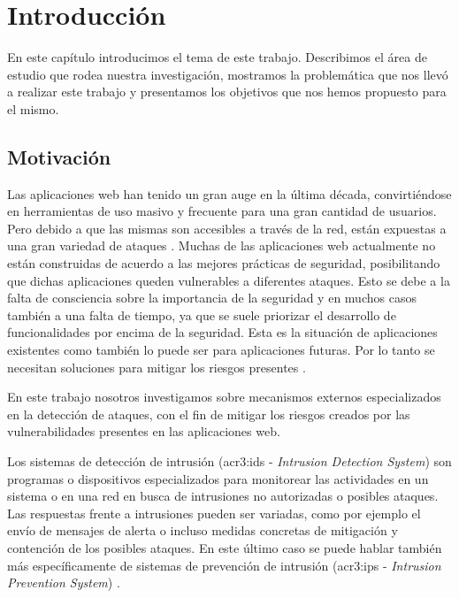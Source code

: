 \renewcommand{\newCommandChapterTitle}{Introducción}
\chapter{\newCommandChapterTitle}
\markright{\hfill \thechapter. \newCommandChapterTitle}
\label{chap:p3_introduction}


En este capítulo introducimos el tema de este trabajo. Describimos el área
de estudio que rodea nuestra investigación, mostramos la problemática que
nos llevó a realizar este trabajo y presentamos los objetivos que nos
hemos propuesto para el mismo.


\section{Motivación}

Las aplicaciones web han tenido un gran auge en la última década,
convirtiéndose en herramientas de uso masivo y frecuente para una gran
cantidad de usuarios. Pero debido a que las mismas son accesibles a
través de la red, están expuestas a una gran variedad de ataques
\citep{gimenez2015tfg}. %
Muchas de las aplicaciones web actualmente no están construidas de acuerdo
a las mejores prácticas de seguridad, posibilitando que  dichas aplicaciones
queden vulnerables a diferentes ataques.
Esto se debe a la falta de consciencia sobre la importancia de la seguridad
y en muchos casos también a una falta de tiempo, ya que se suele priorizar
el desarrollo de funcionalidades por encima de la seguridad. Esta es la
situación de aplicaciones existentes como también lo puede ser para
aplicaciones futuras. Por lo tanto se necesitan soluciones para mitigar
los riesgos presentes
\citep{robertson2009detecting}. %

En este trabajo nosotros investigamos sobre mecanismos externos
especializados en la detección de ataques, con el fin de mitigar los
riesgos creados por las vulnerabilidades presentes en las aplicaciones
web.
\bigskip

Los sistemas de detección de intrusión (\gls{acr3:ids} - \textit{Intrusion
Detection System}) son programas o dispositivos especializados para
monitorear las actividades en un sistema o en una red en busca de intrusiones
no autorizadas o posibles ataques. Las respuestas frente a intrusiones
pueden ser variadas, como por ejemplo el envío de mensajes de alerta o
incluso medidas concretas de mitigación y contención de los posibles
ataques. En este último caso se puede hablar también más específicamente
de sistemas de prevención de intrusión (\gls{acr3:ips} -
\textit{Intrusion Prevention System})
\citep{scarfone2007guide}. %


